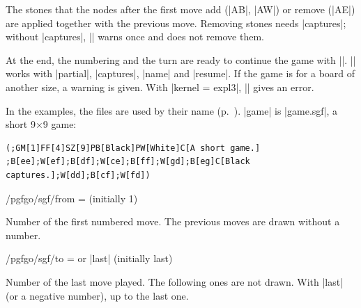 The stones that the nodes after the first move add (|AB|, |AW|) or remove (|AE|) are applied together with the previous move. Removing stones needs |captures|; without |captures|, |\sgf| warns once and does not remove them.

At the end, the numbering and the turn are ready to continue the game with |\moves|. |\sgf| works with |partial|, |captures|, |name| and |resume|. If the game is for a board of another size, a warning is given. With |kernel = expl3|, |\sgf| gives an error.

In the examples, the files are used by their name (p.~\pageref{subsec:sgfnombres}). |game| is |game.sgf|, a short 9$\times$9 game:
\begin{verbatim}
(;GM[1]FF[4]SZ[9]PB[Black]PW[White]C[A short game.]
;B[ee];W[ef];B[df];W[ce];B[ff];W[gd];B[eg]C[Black captures.];W[dd];B[cf];W[fd])
\end{verbatim}

\begin{codeexample}[width=5cm]
	\begin{goban}[label = {at = {north, west}}]
	\end{goban}
\end{codeexample}

\begin{codeexample}[width=5cm]
	\begin{goban}[label = {at = {north, west}}, captures]
	\end{goban}
\end{codeexample}

\begin{key}{/pgfgo/sgf/from =  (initially 1)}

	Number of the first numbered move. The previous moves are drawn without a number.

	\begin{codeexample}[width=5cm]
		\begin{goban}[captures]
		\end{goban}
	\end{codeexample}
\end{key}

\begin{key}{/pgfgo/sgf/to =  or |last| (initially last)}

	Number of the last move played. The following ones are not drawn. With |last| (or a negative number), up to the last one.

	\begin{codeexample}[width=5cm]
		\begin{goban}[captures]
		\end{goban}
	\end{codeexample}
\end{key}


